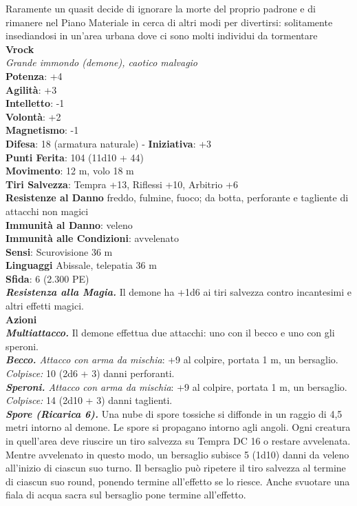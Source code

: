 \begin{multicols}{2}
Raramente un quasit decide di ignorare la morte del proprio padrone e di rimanere nel Piano Materiale in cerca di altri modi per divertirsi: solitamente insediandosi in un'area urbana dove ci sono molti individui da tormentare\\

\medskip\textbf{Vrock}\\
\emph{Grande immondo (demone), caotico malvagio}\\
\textbf{Potenza}: +4\\
\textbf{Agilità}: +3\\
\textbf{Intelletto}: -1\\
\textbf{Volontà}: +2\\
\textbf{Magnetismo}: -1\\
\textbf{Difesa}: 18 (armatura naturale) - \textbf{Iniziativa}: +3\\
\textbf{Punti Ferita}: 104 (11d10 + 44)\\
\textbf{Movimento}: 12 m, volo 18 m\\
\textbf{Tiri Salvezza}: Tempra +13, Riflessi +10, Arbitrio +6\\
\textbf{Resistenze al Danno} freddo, fulmine, fuoco; da botta, perforante e tagliente di attacchi non magici\\
\textbf{Immunità al Danno}: veleno\\
\textbf{Immunità alle Condizioni}: avvelenato\\
\textbf{Sensi}: Scurovisione 36 m \\
\textbf{Linguaggi} Abissale, telepatia 36 m \\
\textbf{Sfida}: 6 (2.300 PE)\smallskip\\
\emph{\textbf{Resistenza alla Magia.}} Il demone ha +1d6 ai tiri salvezza contro incantesimi e altri effetti magici.\\
\smallskip\textbf{Azioni}\\
\emph{\textbf{Multiattacco.}} Il demone effettua due attacchi: uno con il becco e uno con gli speroni.\\
\emph{\textbf{Becco.} Attacco con arma da mischia}: +9 al colpire, portata 1 m, un bersaglio.\\
\emph{Colpisce:} 10 (2d6 + 3) danni perforanti.\\
\emph{\textbf{Speroni.} Attacco con arma da mischia}: +9 al colpire, portata 1 m, un bersaglio.\\
\emph{Colpisce:} 14 (2d10 + 3) danni taglienti.\\
\emph{\textbf{Spore (Ricarica 6).}} Una nube di spore tossiche si diffonde in un raggio di 4,5 metri intorno al demone. Le spore si propagano intorno agli angoli. Ogni creatura in quell'area deve riuscire un tiro salvezza su Tempra DC  16 o restare avvelenata. Mentre  avvelenato in questo modo, un bersaglio subisce 5 (1d10) danni da veleno all'inizio di ciascun suo turno. Il bersaglio può ripetere il tiro salvezza al termine di ciascun suo round, ponendo termine all'effetto se lo riesce. Anche svuotare una fiala di acqua sacra sul bersaglio pone termine all'effetto.\\

\end{multicols}
